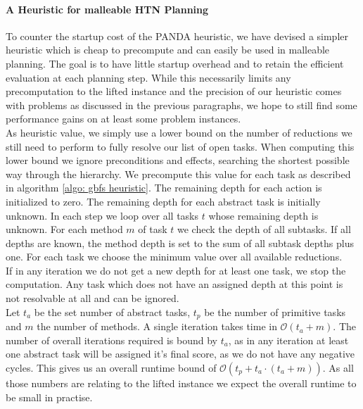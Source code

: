 \paragraph{A Heuristic for malleable HTN Planning}
To counter the startup cost of the PANDA heuristic, we have devised a simpler heuristic which is cheap to precompute and can easily be used in malleable planning. The goal is to have little startup overhead and to retain the efficient evaluation at each planning step. While this necessarily limits any precomputation to the lifted instance and the precision of our heuristic comes with problems as discussed in the previous paragraphs, we hope to still find some performance gains on at least some problem instances. \\
As heuristic value, we simply use a lower bound on the number of reductions we still need to perform to fully resolve our list of open tasks. When computing this lower bound we ignore preconditions and effects, searching the shortest possible way through the hierarchy. We precompute this value for each task as described in algorithm \ref{algo: gbfs heuristic}. The remaining depth for each action is initialized to zero. The remaining depth for each abstract task is initially unknown. In each step we loop over all tasks $t$ whose remaining depth is unknown. For each method $m$ of task $t$ we check the depth of all subtasks. If all depths are known, the method depth is set to the sum of all subtask depths plus one. For each task we choose the minimum value over all available reductions. \\
If in any iteration we do not get a new depth for at least one task, we stop the computation. Any task which does not have an assigned depth at this point is not resolvable at all and can be ignored. \\
Let $t_a$ be the set number of abstract tasks, $t_p$ be the number of primitive tasks and $m$ the number of methods. A single iteration takes time in $\mathcal{O}(t_a + m)$. The number of overall iterations required is bound by $t_a$, as in any iteration at least one abstract task will be assigned it's final score, as we do not have any negative cycles. This gives us an overall runtime bound of $\mathcal{O}(t_p + t_a \cdot(t_a + m))$. As all those numbers are relating to the lifted instance we expect the overall runtime to be small in practise.
